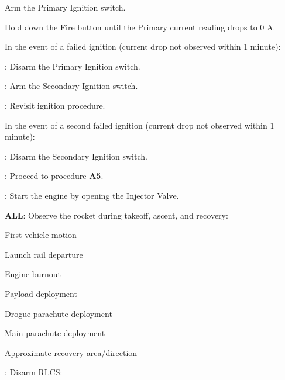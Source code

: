 \begin{checklist}
    \begin{checklist}
        \item Arm the Primary Ignition switch.
        \item Hold down the Fire button until the Primary current reading drops to 0 A.
        \begin{checklist}[label=$\bullet$]
            \item In the event of a failed ignition (current drop not observed within 1 minute):
            \begin{checklist}
                \item \primary: Disarm the Primary Ignition switch.
                \item \primary: Arm the Secondary Ignition switch.
                \item \ops: Revisit ignition procedure.
            \end{checklist}
            \item In the event of a second failed ignition (current drop not observed within 1 minute):
            \begin{checklist}
                \item \primary: Disarm the Secondary Ignition switch.
                \item \ops: Proceed to procedure \textbf{A5}.
            \end{checklist}
        \end{checklist}
        \item \primary: Start the engine by opening the Injector Valve.
    \end{checklist}
    \item \textbf{ALL}: Observe the rocket during takeoff, ascent, and recovery:
    \begin{checklist}
        \item First vehicle motion
        \item Launch rail departure
        \item Engine burnout
        \item Payload deployment
        \item Drogue parachute deployment
        \item Main parachute deployment
        \item Approximate recovery area/direction
    \end{checklist}
    \item \control{}: Disarm RLCS:
    \begin{checklist}

\end{checklist}
\end{checklist}
